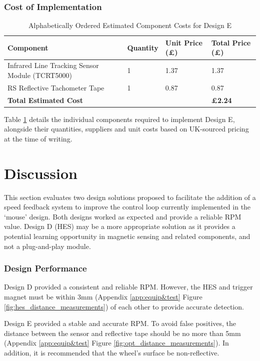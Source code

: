 \subsubsection{Cost of Implementation}
\begin{table}[H]
\centering
\caption{Alphabetically Ordered Estimated Component Costs for Design E}
\label{tab:design_e_cost}
\begin{tabularx}{\linewidth}{|l|X|X|X|}
\hline
\textbf{Component}                                   & \textbf{Quantity} & \textbf{Unit Price (£)} & \textbf{Total Price (£)} \\ \hline
Infrared Line Tracking Sensor Module (TCRT5000) \cite{Switch_TCRT5000} & 1 & 1.37  & 1.37\\ \hline
RS Reflective Tachometer Tape \cite{RS_8459731}& 1 & 0.87 & 0.87\\ \hline\hline
\textbf{Total Estimated Cost}                        &   &       & \textbf{£2.24} \\ \hline
\end{tabularx}
\end{table}

Table \ref{tab:design_e_cost} details the individual components required to implement Design E, alongside their quantities, suppliers and unit costs based on UK-sourced pricing at the time of writing.

\newpage
\section{Discussion}
This section evaluates two design solutions proposed to facilitate the addition of a speed feedback system to improve the control loop currently implemented in the `mouse' design. Both designs worked as expected and provide a reliable RPM value. Design D (HES) may be a more appropriate solution as it provides a potential learning opportunity in magnetic sensing and related components, and not a plug-and-play module. 

\subsubsection{Design Performance}
Design D provided a consistent and reliable RPM. However, the HES and trigger magnet must be within 3mm (Appendix \ref{app:equip&test} Figure \ref{fig:hes_distance_measurements}) of each other to provide accurate detection.

Design E provided a stable and accurate RPM. To avoid false positives, the distance between the sensor and reflective tape should be no more than 5mm (Appendix \ref{app:equip&test} Figure \ref{fig:opt_distance_measurements}). In addition, it is recommended that the wheel's surface be non-reflective.


